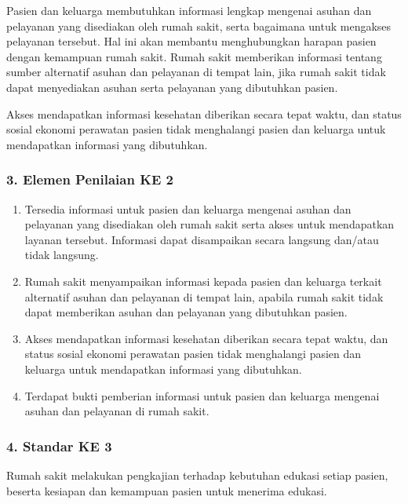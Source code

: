 \documentclass[
]{book}
\providecommand{\tightlist}{%
  \setlength{\itemsep}{0pt}\setlength{\parskip}{0pt}}
\begin{document}
Pasien dan keluarga membutuhkan informasi lengkap mengenai asuhan dan pelayanan yang disediakan oleh rumah sakit, serta bagaimana untuk mengakses pelayanan tersebut. Hal ini akan membantu menghubungkan harapan pasien dengan kemampuan rumah sakit. Rumah sakit memberikan informasi tentang sumber alternatif asuhan dan pelayanan di tempat lain, jika rumah sakit tidak dapat menyediakan asuhan serta pelayanan yang dibutuhkan pasien.

Akses mendapatkan informasi kesehatan diberikan secara tepat waktu, dan status sosial ekonomi perawatan pasien tidak menghalangi pasien dan keluarga untuk mendapatkan informasi yang dibutuhkan.

\hypertarget{elemen-penilaian-ke-2}{%
\subsubsection*{3. Elemen Penilaian KE 2}\label{elemen-penilaian-ke-2}}

\begin{enumerate}
\def\labelenumi{\alph{enumi}.}
\tightlist
\item
  Tersedia informasi untuk pasien dan keluarga mengenai asuhan dan pelayanan yang disediakan oleh rumah sakit serta akses untuk mendapatkan layanan tersebut. Informasi dapat disampaikan secara langsung dan/atau tidak langsung.
\item
  Rumah sakit menyampaikan informasi kepada pasien dan keluarga terkait alternatif asuhan dan pelayanan di tempat lain, apabila rumah sakit tidak dapat memberikan asuhan dan pelayanan yang dibutuhkan pasien.
\item
  Akses mendapatkan informasi kesehatan diberikan secara tepat waktu, dan status sosial ekonomi perawatan pasien tidak menghalangi pasien dan keluarga untuk mendapatkan informasi yang dibutuhkan.
\item
  Terdapat bukti pemberian informasi untuk pasien dan keluarga mengenai asuhan dan pelayanan di rumah sakit.
\end{enumerate}

\hypertarget{standar-ke-3}{%
\subsubsection*{4. Standar KE 3}\label{standar-ke-3}}

Rumah sakit melakukan pengkajian terhadap kebutuhan edukasi setiap pasien, beserta kesiapan dan kemampuan pasien untuk menerima edukasi.
\end{document}
